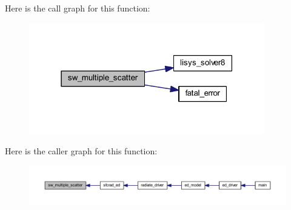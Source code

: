 Here is the call graph for this function\+:\nopagebreak
\begin{figure}[H]
\begin{center}
\leavevmode
\includegraphics[width=291pt]{multiple__scatter_8f90_a2a48cb88f4cbc8013f2b09b2fc878d1b_cgraph}
\end{center}
\end{figure}




Here is the caller graph for this function\+:\nopagebreak
\begin{figure}[H]
\begin{center}
\leavevmode
\includegraphics[width=350pt]{multiple__scatter_8f90_a2a48cb88f4cbc8013f2b09b2fc878d1b_icgraph}
\end{center}
\end{figure}


